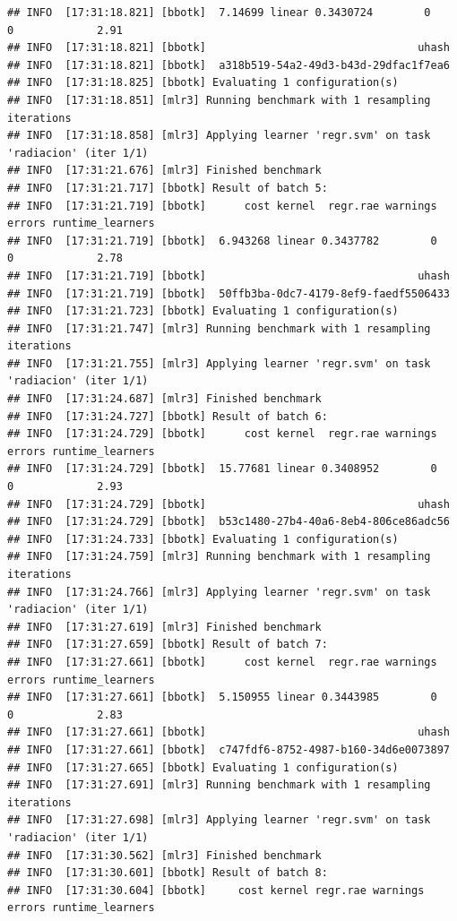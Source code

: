 \documentclass[
  11pt,
  a4paper,
]{article}
\begin{document}
\begin{verbatim}
## INFO  [17:31:18.821] [bbotk]  7.14699 linear 0.3430724        0      0             2.91
## INFO  [17:31:18.821] [bbotk]                                 uhash
## INFO  [17:31:18.821] [bbotk]  a318b519-54a2-49d3-b43d-29dfac1f7ea6
## INFO  [17:31:18.825] [bbotk] Evaluating 1 configuration(s)
## INFO  [17:31:18.851] [mlr3] Running benchmark with 1 resampling iterations
## INFO  [17:31:18.858] [mlr3] Applying learner 'regr.svm' on task 'radiacion' (iter 1/1)
## INFO  [17:31:21.676] [mlr3] Finished benchmark
## INFO  [17:31:21.717] [bbotk] Result of batch 5:
## INFO  [17:31:21.719] [bbotk]      cost kernel  regr.rae warnings errors runtime_learners
## INFO  [17:31:21.719] [bbotk]  6.943268 linear 0.3437782        0      0             2.78
## INFO  [17:31:21.719] [bbotk]                                 uhash
## INFO  [17:31:21.719] [bbotk]  50ffb3ba-0dc7-4179-8ef9-faedf5506433
## INFO  [17:31:21.723] [bbotk] Evaluating 1 configuration(s)
## INFO  [17:31:21.747] [mlr3] Running benchmark with 1 resampling iterations
## INFO  [17:31:21.755] [mlr3] Applying learner 'regr.svm' on task 'radiacion' (iter 1/1)
## INFO  [17:31:24.687] [mlr3] Finished benchmark
## INFO  [17:31:24.727] [bbotk] Result of batch 6:
## INFO  [17:31:24.729] [bbotk]      cost kernel  regr.rae warnings errors runtime_learners
## INFO  [17:31:24.729] [bbotk]  15.77681 linear 0.3408952        0      0             2.93
## INFO  [17:31:24.729] [bbotk]                                 uhash
## INFO  [17:31:24.729] [bbotk]  b53c1480-27b4-40a6-8eb4-806ce86adc56
## INFO  [17:31:24.733] [bbotk] Evaluating 1 configuration(s)
## INFO  [17:31:24.759] [mlr3] Running benchmark with 1 resampling iterations
## INFO  [17:31:24.766] [mlr3] Applying learner 'regr.svm' on task 'radiacion' (iter 1/1)
## INFO  [17:31:27.619] [mlr3] Finished benchmark
## INFO  [17:31:27.659] [bbotk] Result of batch 7:
## INFO  [17:31:27.661] [bbotk]      cost kernel  regr.rae warnings errors runtime_learners
## INFO  [17:31:27.661] [bbotk]  5.150955 linear 0.3443985        0      0             2.83
## INFO  [17:31:27.661] [bbotk]                                 uhash
## INFO  [17:31:27.661] [bbotk]  c747fdf6-8752-4987-b160-34d6e0073897
## INFO  [17:31:27.665] [bbotk] Evaluating 1 configuration(s)
## INFO  [17:31:27.691] [mlr3] Running benchmark with 1 resampling iterations
## INFO  [17:31:27.698] [mlr3] Applying learner 'regr.svm' on task 'radiacion' (iter 1/1)
## INFO  [17:31:30.562] [mlr3] Finished benchmark
## INFO  [17:31:30.601] [bbotk] Result of batch 8:
## INFO  [17:31:30.604] [bbotk]     cost kernel regr.rae warnings errors runtime_learners

\end{verbatim}
\end{document}
